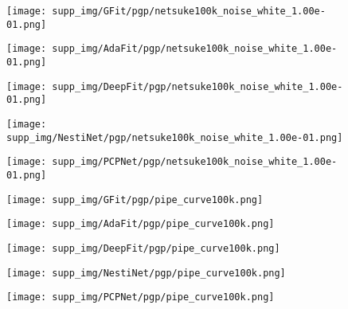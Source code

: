 \documentclass[runningheads]{llncs}
\begin{document}
\begin{figure*}
\begin{subfigure}{0.15\linewidth}
		\centering
		\texttt{[image: supp\_img/GFit/pgp/netsuke100k\_noise\_white\_1.00e-01.png]}
\end{subfigure}
	\hspace{0.1cm}
	\begin{subfigure}{0.15\linewidth}
		\centering
		\texttt{[image: supp\_img/AdaFit/pgp/netsuke100k\_noise\_white\_1.00e-01.png]}
\end{subfigure}
	\hspace{0.1cm}
	\begin{subfigure}{0.17\linewidth}
		\centering
		\texttt{[image: supp\_img/DeepFit/pgp/netsuke100k\_noise\_white\_1.00e-01.png]}
\end{subfigure}
	\hspace{0.1cm}
	\begin{subfigure}{0.17\linewidth}
		\centering
		\texttt{[image: supp\_img/NestiNet/pgp/netsuke100k\_noise\_white\_1.00e-01.png]}
\end{subfigure}
	\hspace{0.1cm}
	\begin{subfigure}{0.17\linewidth}
		\centering
		\texttt{[image: supp\_img/PCPNet/pgp/netsuke100k\_noise\_white\_1.00e-01.png]}
\end{subfigure}
	
\begin{subfigure}{0.15\linewidth}
		\centering
		\texttt{[image: supp\_img/GFit/pgp/pipe\_curve100k.png]}
\end{subfigure}
	\hspace{0.1cm}
	\begin{subfigure}{0.15\linewidth}
		\centering
		\texttt{[image: supp\_img/AdaFit/pgp/pipe\_curve100k.png]}
\end{subfigure}
	\hspace{0.1cm}
	\begin{subfigure}{0.17\linewidth}
		\centering
		\texttt{[image: supp\_img/DeepFit/pgp/pipe\_curve100k.png]}
\end{subfigure}
	\hspace{0.1cm}
	\begin{subfigure}{0.17\linewidth}
		\centering
		\texttt{[image: supp\_img/NestiNet/pgp/pipe\_curve100k.png]}
\end{subfigure}
	\hspace{0.1cm}
	\begin{subfigure}{0.17\linewidth}
		\centering
		\texttt{[image: supp\_img/PCPNet/pgp/pipe\_curve100k.png]}
\end{subfigure}
	

\end{figure*}
\end{document}
